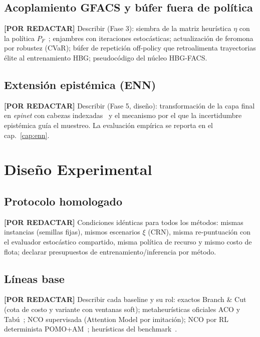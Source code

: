 \documentclass[12pt]{report}
\newcommand{\pendiente}[1]{\par\noindent\colorbox{lightbg}{%
  \begin{minipage}{0.94\linewidth}\small
  \textcolor{uanlgold}{\textbf{[POR REDACTAR]}} #1
  \end{minipage}}\par\medskip}
\begin{document}
\section{Acoplamiento GFACS y b\'ufer fuera de pol\'itica}\label{sec:acoplamiento}
\pendiente{Describir (Fase 3): siembra de la matriz heur\'istica $\eta$ con la
pol\'itica $P_F$~\cite{Kim2024GFACS}; enjambres con iteraciones estoc\'asticas;
actualizaci\'on de feromona por robustez (CVaR); b\'ufer de repetici\'on
off-policy que retroalimenta trayectorias \'elite al entrenamiento HBG;
pseudoc\'odigo del n\'ucleo HBG-FACS.}

\section{Extensi\'on epist\'emica (ENN)}\label{sec:met-enn}
\pendiente{Describir (Fase 5, dise\~no): transformaci\'on de la capa final en
\textit{epinet} con cabezas indexadas~\cite{ENN_GFN_2025} y el mecanismo por el
que la incertidumbre epist\'emica gu\'ia el muestreo. La evaluaci\'on emp\'irica
se reporta en el cap.~\ref{cap:enn}.}

\chapter{Dise\~no Experimental}\label{cap:experimental}

\section{Protocolo homologado}\label{sec:protocolo}
\pendiente{Condiciones id\'enticas para todos los m\'etodos: mismas instancias
(semillas fijas), mismos escenarios $\xi$ (CRN), misma re-puntuaci\'on con el
evaluador estoc\'astico compartido, misma pol\'itica de recurso y mismo costo de
flota; declarar presupuestos de entrenamiento/inferencia por m\'etodo.}

\section{L\'ineas base}\label{sec:baselines}
\pendiente{Describir cada baseline y su rol: exactos Branch \& Cut (cota de
costo y variante con ventanas soft); metaheur\'isticas oficiales ACO y
Tab\'u~\cite{Dorigo1996AntSystem}; NCO supervisada (Attention Model por
imitaci\'on); NCO por RL determinista POMO+AM~\cite{Kwon2020POMO,
Kool2019Attention}; heur\'isticas del benchmark~\cite{Heakl2025SVRP}.}
\end{document}
